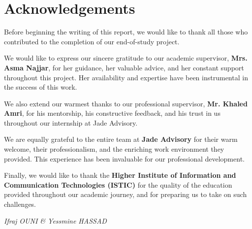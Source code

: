 \chapter*{Acknowledgements}

Before beginning the writing of this report, we would like to thank all
those who contributed to the completion of our end-of-study project.

We would like to express our sincere gratitude to our academic supervisor,
\textbf{Mrs. Asma Najjar}, for her guidance, her valuable advice, and her
constant support throughout this project. Her availability and expertise
have been instrumental in the success of this work.

We also extend our warmest thanks to our professional supervisor,
\textbf{Mr. Khaled Amri}, for his mentorship, his constructive feedback,
and his trust in us throughout our internship at Jade Advisory.

We are equally grateful to the entire team at \textbf{Jade Advisory}
for their warm welcome, their professionalism, and the enriching work
environment they provided. This experience has been invaluable for our
professional development.

Finally, we would like to thank the \textbf{Higher Institute of Information
and Communication Technologies (ISTIC)} for the quality of the education
provided throughout our academic journey, and for preparing us to take on
such challenges.

\vfill
\begin{flushright}
\textit{Ifraj OUNI \& Yessmine HASSAD}
\end{flushright}